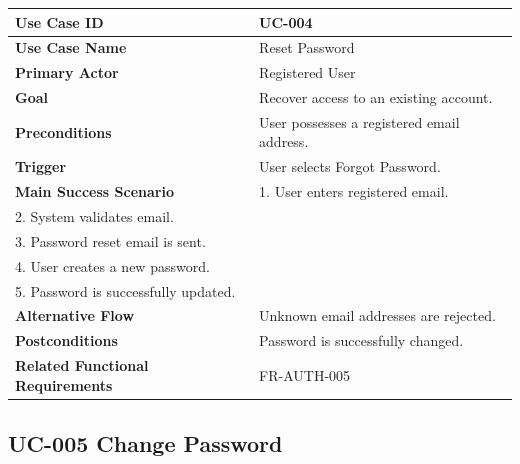 \begin{longtable}{|p{4cm}|p{10cm}|}

\hline
\textbf{Use Case ID} &
UC-004 \\
\hline

\textbf{Use Case Name} &
Reset Password \\
\hline

\textbf{Primary Actor} &
Registered User \\
\hline

\textbf{Goal} &
Recover access to an existing account. \\
\hline

\textbf{Preconditions} &
User possesses a registered email address. \\
\hline

\textbf{Trigger} &
User selects Forgot Password. \\
\hline

\textbf{Main Success Scenario} &
1. User enters registered email.\\
2. System validates email.\\
3. Password reset email is sent.\\
4. User creates a new password.\\
5. Password is successfully updated.\\
\hline

\textbf{Alternative Flow} &
Unknown email addresses are rejected. \\
\hline

\textbf{Postconditions} &
Password is successfully changed. \\
\hline

\textbf{Related Functional Requirements} &
FR-AUTH-005 \\
\hline

\end{longtable}

\subsection{UC-005 Change Password}

